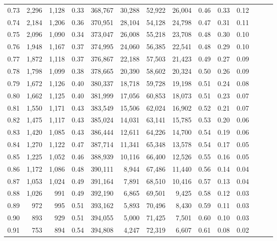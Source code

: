 \begin{tabular}{rrrrrrrrrrrrrr}
0.73 &  2,296 &  1,128 &  0.33 &  368,767 &   30,288 &  52,922 &  26,004 &  0.46 &  0.33 &      0.12 \\
0.74 &  2,184 &  1,206 &  0.36 &  370,951 &   28,104 &  54,128 &  24,798 &  0.47 &  0.31 &      0.11 \\
0.75 &  2,096 &  1,090 &  0.34 &  373,047 &   26,008 &  55,218 &  23,708 &  0.48 &  0.30 &      0.10 \\
0.76 &  1,948 &  1,167 &  0.37 &  374,995 &   24,060 &  56,385 &  22,541 &  0.48 &  0.29 &      0.10 \\
0.77 &  1,872 &  1,118 &  0.37 &  376,867 &   22,188 &  57,503 &  21,423 &  0.49 &  0.27 &      0.09 \\
0.78 &  1,798 &  1,099 &  0.38 &  378,665 &   20,390 &  58,602 &  20,324 &  0.50 &  0.26 &      0.09 \\
0.79 &  1,672 &  1,126 &  0.40 &  380,337 &   18,718 &  59,728 &  19,198 &  0.51 &  0.24 &      0.08 \\
0.80 &  1,662 &  1,125 &  0.40 &  381,999 &   17,056 &  60,853 &  18,073 &  0.51 &  0.23 &      0.07 \\
0.81 &  1,550 &  1,171 &  0.43 &  383,549 &   15,506 &  62,024 &  16,902 &  0.52 &  0.21 &      0.07 \\
0.82 &  1,475 &  1,117 &  0.43 &  385,024 &   14,031 &  63,141 &  15,785 &  0.53 &  0.20 &      0.06 \\
0.83 &  1,420 &  1,085 &  0.43 &  386,444 &   12,611 &  64,226 &  14,700 &  0.54 &  0.19 &      0.06 \\
0.84 &  1,270 &  1,122 &  0.47 &  387,714 &   11,341 &  65,348 &  13,578 &  0.54 &  0.17 &      0.05 \\
0.85 &  1,225 &  1,052 &  0.46 &  388,939 &   10,116 &  66,400 &  12,526 &  0.55 &  0.16 &      0.05 \\
0.86 &  1,172 &  1,086 &  0.48 &  390,111 &    8,944 &  67,486 &  11,440 &  0.56 &  0.14 &      0.04 \\
0.87 &  1,053 &  1,024 &  0.49 &  391,164 &    7,891 &  68,510 &  10,416 &  0.57 &  0.13 &      0.04 \\
0.88 &  1,026 &    991 &  0.49 &  392,190 &    6,865 &  69,501 &   9,425 &  0.58 &  0.12 &      0.03 \\
0.89 &    972 &    995 &  0.51 &  393,162 &    5,893 &  70,496 &   8,430 &  0.59 &  0.11 &      0.03 \\
0.90 &    893 &    929 &  0.51 &  394,055 &    5,000 &  71,425 &   7,501 &  0.60 &  0.10 &      0.03 \\
0.91 &    753 &    894 &  0.54 &  394,808 &    4,247 &  72,319 &   6,607 &  0.61 &  0.08 &      0.02 \\

\end{tabular}
